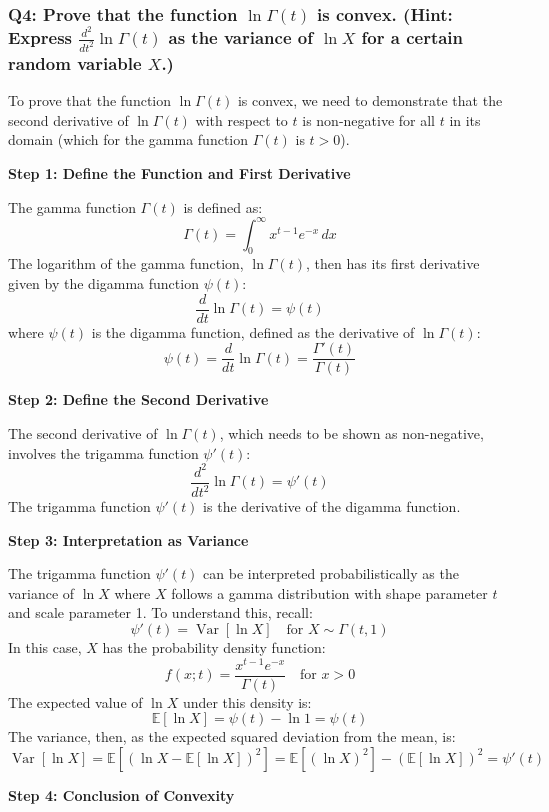 \documentclass[8pt]{article}
\begin{document}
{\subsubsection*{Q4: Prove that the function \(\ln \Gamma(t)\) is convex. (Hint: Express \( \frac{d^2}{dt^2} \ln \Gamma(t)\) as the variance of \(\ln X\) for a certain random variable \(X\).)}

To prove that the function \(\ln \Gamma(t)\) is convex, we need to demonstrate that the second derivative of \(\ln \Gamma(t)\) with respect to \(t\) is non-negative for all \(t\) in its domain (which for the gamma function \(\Gamma(t)\) is \(t > 0\)).

\textbf{Step 1: Define the Function and First Derivative}

The gamma function \(\Gamma(t)\) is defined as:
\[
\Gamma(t) = \int_0^\infty x^{t-1} e^{-x} \, dx
\]
The logarithm of the gamma function, \(\ln \Gamma(t)\), then has its first derivative given by the digamma function \(\psi(t)\):
\[
\frac{d}{dt} \ln \Gamma(t) = \psi(t)
\]
where \(\psi(t)\) is the digamma function, defined as the derivative of \(\ln \Gamma(t)\):
\[
\psi(t) = \frac{d}{dt} \ln \Gamma(t) = \frac{\Gamma'(t)}{\Gamma(t)}
\]

\textbf{Step 2: Define the Second Derivative}

The second derivative of \(\ln \Gamma(t)\), which needs to be shown as non-negative, involves the trigamma function \(\psi'(t)\):
\[
\frac{d^2}{dt^2} \ln \Gamma(t) = \psi'(t)
\]
The trigamma function \(\psi'(t)\) is the derivative of the digamma function.

\textbf{Step 3: Interpretation as Variance}

The trigamma function \(\psi'(t)\) can be interpreted probabilistically as the variance of \(\ln X\) where \(X\) follows a gamma distribution with shape parameter \(t\) and scale parameter 1. To understand this, recall:
\[
\psi'(t) = \operatorname{Var}[\ln X] \quad \text{for } X \sim \Gamma(t, 1)
\]
In this case, \(X\) has the probability density function:
\[
f(x; t) = \frac{x^{t-1} e^{-x}}{\Gamma(t)} \quad \text{for } x > 0
\]
The expected value of \(\ln X\) under this density is:
\[
\mathbb{E}[\ln X] = \psi(t) - \ln 1 = \psi(t)
\]
The variance, then, as the expected squared deviation from the mean, is:
\[
\operatorname{Var}[\ln X] = \mathbb{E}[(\ln X - \mathbb{E}[\ln X])^2] = \mathbb{E}[(\ln X)^2] - (\mathbb{E}[\ln X])^2 = \psi'(t)
\]

\textbf{Step 4: Conclusion of Convexity}

}
\end{document}
